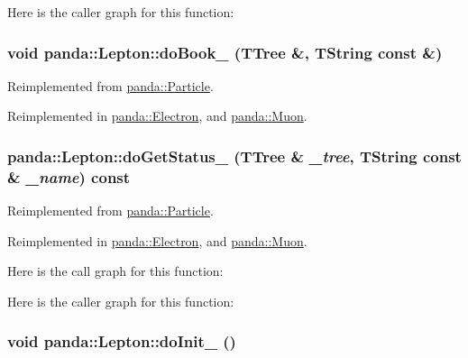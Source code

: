 Here is the caller graph for this function:\hypertarget{classpanda_1_1Lepton_af9d74c974117a26f53e60da918cb84ba}{
\subsubsection[{doBook\_\-}]{\setlength{\rightskip}{0pt plus 5cm}void panda::Lepton::doBook\_\- (TTree \&, \/  TString const \&)}}
\label{classpanda_1_1Lepton_af9d74c974117a26f53e60da918cb84ba}


Reimplemented from \hyperlink{classpanda_1_1Particle_a3dab1e8430ed2e287ecd8fdbbdcf3c7e}{panda::Particle}.

Reimplemented in \hyperlink{classpanda_1_1Electron_a2b2000f57a7f009c12bdf33f25d50350}{panda::Electron}, and \hyperlink{classpanda_1_1Muon_af27e42e8f6276dcbcf61ac742b17a4cd}{panda::Muon}.\hypertarget{classpanda_1_1Lepton_a90a170df4cd09d324964da724bcc5428}{
\subsubsection[{doGetStatus\_\-}]{ panda::Lepton::doGetStatus\_\- (TTree \& {\em \_\-tree}, \/  TString const \& {\em \_\-name}) const}}
\label{classpanda_1_1Lepton_a90a170df4cd09d324964da724bcc5428}


Reimplemented from \hyperlink{classpanda_1_1Particle_a7dcbf68bc3e74fdef1e3f3c620fb019a}{panda::Particle}.

Reimplemented in \hyperlink{classpanda_1_1Electron_a3e2097c55d5ab63188d0c04426e47248}{panda::Electron}, and \hyperlink{classpanda_1_1Muon_af2331a81be13a07cc0202a6d107b0685}{panda::Muon}.

Here is the call graph for this function:

Here is the caller graph for this function:\hypertarget{classpanda_1_1Lepton_af764ff1ea6dfb16072d6c9de3b935129}{
\subsubsection[{doInit\_\-}]{\setlength{\rightskip}{0pt plus 5cm}void panda::Lepton::doInit\_\- ()}}
\label{classpanda_1_1Lepton_af764ff1ea6dfb16072d6c9de3b935129}


